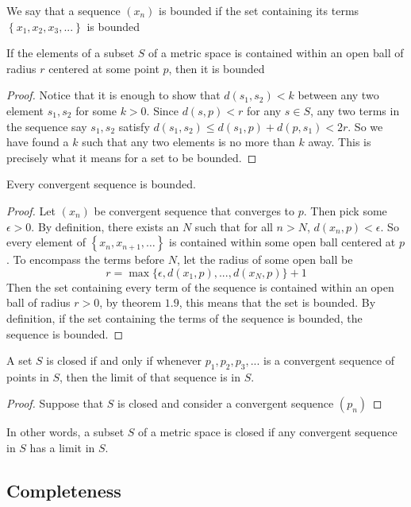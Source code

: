 \documentclass{article}
\begin{document}
\begin{definition}
    We say that a sequence $(x_n)$ is bounded if the set containing its terms $\left\{ x_1,x_2,x_3,... \right\}$ is bounded
\end{definition}
\begin{theorem}
    If the elements of a subset $S$ of a metric space is contained within an open ball of radius $r$ centered at some point $p$, then it is bounded
\end{theorem}
\begin{proof}
    Notice that it is enough to show that $d(s_1,s_2)<k$ between any two element $s_1,s_2$ for some $k>0$. Since $d(s,p)<r$ for any $s\in S$, any two terms in the sequence say $s_1, s_2$ satisfy $d(s_1,s_2)\leq d(s_1,p) +d(p,s_1)<2r$.
    So we have found a $k$ such that any two elements is no more than $k$ away. This is precisely what it means for a set to be bounded. 
\end{proof}
\begin{theorem}
    Every convergent sequence is bounded.
\end{theorem}
\begin{proof}
    Let $(x_n)$ be convergent sequence that converges to $p$. Then pick some $\epsilon >0$. By definition, there exists an $N$ such that for all $n>N$,
    $d(x_n, p)< \epsilon$. So every element of $\left\{ x_n,x_{n+1},\dots \right\}$ is contained within some open ball centered at $p$. To encompass the terms before $N$, let the 
    radius of some open ball be 
    \[
    r=\max\{ \epsilon, d(x_1,p),..., d(x_N,p)\}+1
    \]
    Then the set containing every term of the sequence is contained within an open ball of radius $r>0$, by theorem $1.9$, this means that the set is bounded. By definition, if the set containing
    the terms of the sequence is bounded, the sequence is bounded.
\end{proof}
\begin{theorem}
    A set $S$ is closed if and only if whenever $p_1,p_2,p_3,...$ is a convergent sequence of points in $S$, then the limit of that sequence is in $S$.
\end{theorem}
\begin{proof}
    Suppose that $S$ is closed and consider a convergent sequence $(p_n)$
\end{proof}

In other words, a subset $S$ of a metric space is closed if any convergent sequence in $S$ has a limit in $S$.


\newpage
\subsection{Completeness}
\end{document}
